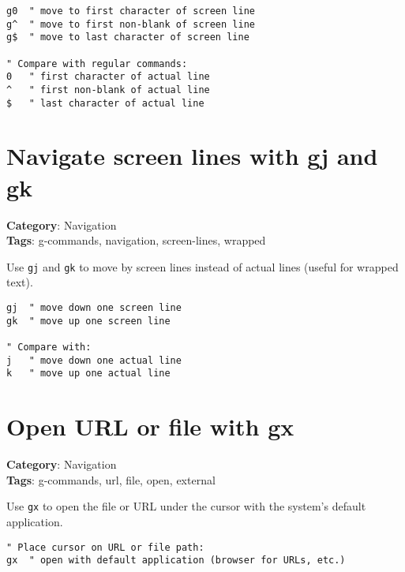 {{{{{{\begin{Exa*}{}
\begin{Verbatim}[fontsize=\footnotesize, breaklines, breakanywhere]
g0  " move to first character of screen line
g^  " move to first non-blank of screen line
g$  " move to last character of screen line

" Compare with regular commands:
0   " first character of actual line
^   " first non-blank of actual line
$   " last character of actual line
\end{Verbatim}
\end{Exa*}

\section{Navigate screen lines with gj and gk}

\textbf{Category}: Navigation\\ \textbf{Tags}: g-commands, navigation, screen-lines, wrapped
\vspace{0.5cm}

Use {\footnotesize \Verb§gj§} and {\footnotesize \Verb§gk§} to move by screen lines instead of actual lines (useful for wrapped text).

\begin{Exa*}{}
\begin{Verbatim}[fontsize=\footnotesize, breaklines, breakanywhere]
gj  " move down one screen line
gk  " move up one screen line

" Compare with:
j   " move down one actual line
k   " move up one actual line
\end{Verbatim}
\end{Exa*}

\section{Open URL or file with gx}

\textbf{Category}: Navigation\\ \textbf{Tags}: g-commands, url, file, open, external
\vspace{0.5cm}

Use {\footnotesize \Verb§gx§} to open the file or URL under the cursor with the system's default application.

\begin{Exa*}{}
\begin{Verbatim}[fontsize=\footnotesize, breaklines, breakanywhere]
" Place cursor on URL or file path:
gx  " open with default application (browser for URLs, etc.)
\end{Verbatim}
\end{Exa*}

}}}}}}
